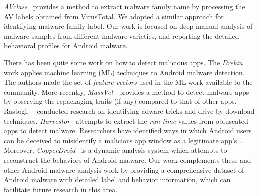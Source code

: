 \emph{AVclass}~\cite{sebastian2016avclass} provides a method to extract malware family name
by processing the AV labels obtained from VirusTotal. 
We adopted a similar approach for identifying malware family label.
Our work is focused on deep manual analysis of malware samples from different malware varieties, 
and reporting the detailed behavioral profiles for Android malware.



There has been quite some work on how to detect malicious apps. 
The \emph{Drebin}~\cite{arp2014drebin} work applies machine learning (ML) techniques to Android malware
detection.
The authors made the set of \emph{feature vectors} used in the ML work available to the community.
More recently, \emph{MassVet}~\cite{chen2015finding} provides a method
to detect malware apps by observing the repackaging traits (if any) 
compared to that of other apps. %
Rastogi, \etal~\cite{rastogi2016these} conducted research on identifying adware tricks and drive-by-download techniques.
\emph{Harvestor}~\cite{rasthofer2016harvesting} attempts to extract the 
\emph{run-time} values from obfuscated apps
to detect malware. Researchers have identified ways in which Android users 
can be deceived to misidentify a malicious app window as a legitimate app's~\cite{bianchi2015app}.
Moreover, \emph{CopperDroid}~\cite{tam2015copperdroid} is a dynamic analysis system which attempts 
to reconstruct the behaviors of Android malware.
Our work complements these and other Android malware analysis work by providing a comprehensive 
dataset of Android malware with detailed label and behavior information, which can facilitate 
future research in this area.




